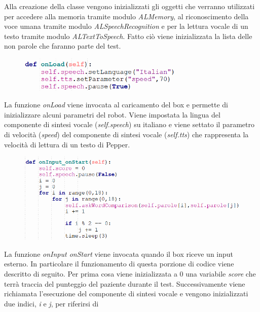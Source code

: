 \begin{sloppypar}
{\begin{figure}[H]
\end{figure}
Alla creazione della classe vengono inizializzati gli oggetti che verranno utilizzati
per accedere alla memoria tramite modulo \textit{ALMemory}, al riconoscimento della
voce umana tramite modulo \textit{ALSpeechRecognition} e per la lettura vocale di un
testo tramite modulo \textit{ALTextToSpeech}. Fatto ciò viene inizializzata la lista delle
non parole che faranno parte del test.
\vspace{0.3cm}
\begin{figure}[H]
\centering
\includegraphics[width=0.7\textwidth]{immagini/lrs2.png}
\end{figure}
\vspace{0.3cm}
La funzione \textit{onLoad} viene invocata al caricamento del box e permette di inizializzare
alcuni parametri del robot. Viene impostata la lingua del componente
di sintesi vocale (\textit{self.speech}) su italiano e viene settato il parametro di velocità
(\textit{speed}) del componente di sintesi vocale (\textit{self.tts}) che rappresenta la velocità di
lettura di un testo di Pepper.
\vspace{0.3cm}
\begin{figure}[H]
\centering
\includegraphics[width=1.05\textwidth]{immagini/lrs3.png}
\end{figure}
\vspace{0.3cm}
La funzione \textit{onInput onStart} viene invocata quando il box riceve un input esterno.
In particolare il funzionamento di questa porzione di codice viene descritto di
seguito.
\newline
Per prima cosa viene inizializzata a 0 una variabile \textit{score} che terrà traccia
del punteggio del paziente durante il test. Successivamente viene richiamata l’esecuzione del
componente di sintesi vocale e vengono inizializzati due indici, \textit{i} e \textit{j}, per riferirsi di
}
\end{sloppypar}

